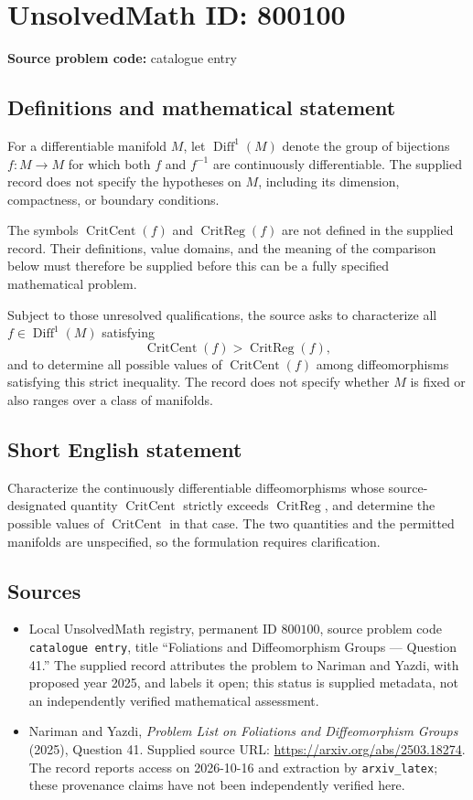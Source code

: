 \documentclass[11pt]{article}
\begin{document}
\section*{UnsolvedMath ID: 800100}
\textbf{Source problem code:} catalogue entry
\subsection{Definitions and mathematical statement}
For a differentiable manifold \(M\), let \(\operatorname{Diff}^{1}(M)\) denote the group of bijections \(f\colon M\to M\) for which both \(f\) and \(f^{-1}\) are continuously differentiable. The supplied record does not specify the hypotheses on \(M\), including its dimension, compactness, or boundary conditions.

The symbols \(\operatorname{CritCent}(f)\) and \(\operatorname{CritReg}(f)\) are not defined in the supplied record. Their definitions, value domains, and the meaning of the comparison below must therefore be supplied before this can be a fully specified mathematical problem.

Subject to those unresolved qualifications, the source asks to characterize all \(f\in\operatorname{Diff}^{1}(M)\) satisfying
\[
\operatorname{CritCent}(f)>\operatorname{CritReg}(f),
\]
and to determine all possible values of \(\operatorname{CritCent}(f)\) among diffeomorphisms satisfying this strict inequality. The record does not specify whether \(M\) is fixed or also ranges over a class of manifolds.
\subsection{Short English statement}
Characterize the continuously differentiable diffeomorphisms whose source-designated quantity \(\operatorname{CritCent}\) strictly exceeds \(\operatorname{CritReg}\), and determine the possible values of \(\operatorname{CritCent}\) in that case. The two quantities and the permitted manifolds are unspecified, so the formulation requires clarification.
\subsection{Sources}
\begin{itemize}
\item Local UnsolvedMath registry, permanent ID \(800100\), source problem code \texttt{catalogue entry}, title ``Foliations and Diffeomorphism Groups --- Question 41.'' The supplied record attributes the problem to Nariman and Yazdi, with proposed year 2025, and labels it open; this status is supplied metadata, not an independently verified mathematical assessment.
\item Nariman and Yazdi, \emph{Problem List on Foliations and Diffeomorphism Groups} (2025), Question 41. Supplied source URL: \url{https://arxiv.org/abs/2503.18274}. The record reports access on 2026-10-16 and extraction by \texttt{arxiv\_latex}; these provenance claims have not been independently verified here.
\end{itemize}
\end{document}
